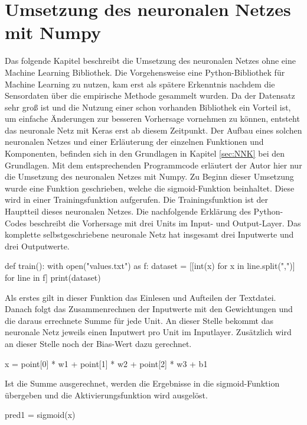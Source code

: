 \section{Umsetzung des neuronalen Netzes mit Numpy}
\label{sec:ums_nn}
Das folgende Kapitel beschreibt die Umsetzung des neuronalen Netzes ohne eine Machine Learning Bibliothek. Die Vorgehensweise eine Python-Bibliothek für Machine Learning zu nutzen, kam erst als spätere Erkenntnis nachdem die Sensordaten über die empirische Methode gesammelt wurden. Da der Datensatz sehr groß ist und die Nutzung einer schon vorhanden Bibliothek ein Vorteil ist, um einfache Änderungen zur besseren Vorhersage vornehmen zu können, entsteht das neuronale Netz mit Keras erst ab diesem Zeitpunkt.
Der Aufbau eines solchen neuronalen Netzes und einer Erläuterung der einzelnen Funktionen und Komponenten, befinden sich in den Grundlagen in Kapitel \ref{sec:NNK} bei den Grundlagen. Mit dem entsprechenden Programmcode erläutert der Autor hier nur die Umsetzung des neuronalen Netzes mit Numpy.
\newline
\newline
Zu Beginn dieser Umsetzung wurde eine Funktion geschrieben, welche die sigmoid-Funktion beinhaltet. Diese wird in einer Trainingsfunktion aufgerufen. Die Trainingsfunktion ist der Hauptteil dieses neuronalen Netzes. 
\newline
Die nachfolgende Erklärung des Python-Codes beschreibt die Vorhersage mit drei Units im Input- und Output-Layer. Das komplette selbstgeschriebene neuronale Netz hat insgesamt drei Inputwerte und drei Outputwerte. 
\begin{python}
def train():
    with open("values.txt") as f:
        dataset = [[int(x) for x in line.split(",")] 
                    for line in f]
        print(dataset)
\end{python}
Als erstes gilt in dieser Funktion das Einlesen und Aufteilen der Textdatei. Danach folgt das Zusammenrechnen der Inputwerte mit den Gewichtungen und die daraus errechnete Summe für jede Unit. An dieser Stelle bekommt das neuronale Netz jeweils einen Inputwert pro Unit im Inputlayer. Zusätzlich wird an dieser Stelle noch der Bias-Wert dazu gerechnet.
\begin{python}
x = point[0] * w1 + point[1] * w2 + point[2] * w3 + b1
\end{python}
Ist die Summe ausgerechnet, werden die Ergebnisse in die sigmoid-Funktion übergeben und die Aktivierungsfunktion wird ausgelöst.
\begin{python}
pred1 = sigmoid(x)
\end{python}
